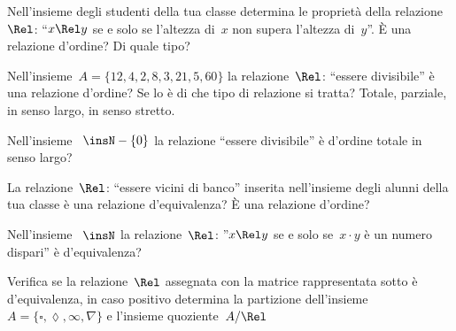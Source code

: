 \begin{esercizio}
\label{ese:B.48}
Nell'insieme degli studenti della tua classe determina le proprietà della 
relazione~$\Rel$: ``$x \Rel y$ se e solo se l'altezza di~$x$ non supera 
l'altezza di~$y$''. È una relazione d'ordine? Di quale tipo?
\end{esercizio}

\begin{esercizio}
\label{ese:B.49}
Nell'insieme~$A = \{ 12, 4, 2, 8, 3, 21, 5, 60 \}$ la relazione~$\Rel$: 
``essere divisibile'' è una relazione d'ordine? Se lo è di che tipo di 
relazione si tratta? Totale, parziale, in senso largo, in senso stretto.
\end{esercizio}

\begin{esercizio}
\label{ese:B.50}
Nell'insieme ~$\insN - \{ 0 \}$ la relazione ``essere divisibile'' è d'ordine 
totale in senso largo?
\end{esercizio}

\begin{esercizio}
\label{ese:B.53}
La relazione~$\Rel$: ``essere vicini di banco'' inserita nell'insieme degli 
alunni della tua classe è una relazione d'equivalenza? 
È una relazione d'ordine?
\end{esercizio}

\begin{esercizio}
\label{ese:B.55}
Nell'insieme ~$\insN$ la relazione~$\Rel$: 
''$x \Rel y$ se e solo se~$x \cdot y$ è un numero dispari'' è d'equivalenza?
\end{esercizio}

\begin{esercizio}
\label{ese:B.57}
Verifica se la relazione~$\Rel$ assegnata con la matrice rappresentata
sotto è d'equivalenza, in caso positivo determina la partizione 
dell'insieme~$A =\{\square, \lozenge, \infty, \nabla\}$ e l'insieme
quoziente~$A/\Rel$
\end{esercizio}


